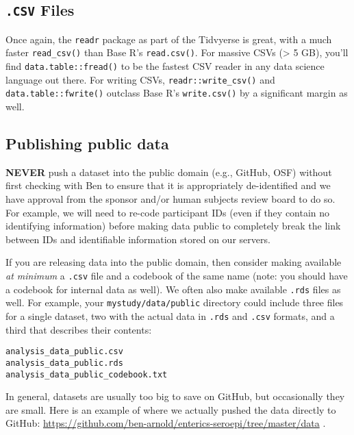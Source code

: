 \documentclass[
]{book}
\begin{document}
\hypertarget{csv-files}{%
\subsection{\texorpdfstring{\texttt{.CSV} Files}{.CSV Files}}\label{csv-files}}

Once again, the \texttt{readr} package as part of the Tidvyerse is great, with a much faster \texttt{read\_csv()} than Base R's \texttt{read.csv()}. For massive CSVs (\textgreater{} 5 GB), you'll find \texttt{data.table::fread()} to be the fastest CSV reader in any data science language out there. For writing CSVs, \texttt{readr::write\_csv()} and \texttt{data.table::fwrite()} outclass Base R's \texttt{write.csv()} by a significant margin as well.

\hypertarget{publishing-public-data}{%
\subsection{Publishing public data}\label{publishing-public-data}}

\textbf{NEVER} push a dataset into the public domain (e.g., GitHub, OSF) without first checking with Ben to ensure that it is appropriately de-identified and we have approval from the sponsor and/or human subjects review board to do so. For example, we will need to re-code participant IDs (even if they contain no identifying information) before making data public to completely break the link between IDs and identifiable information stored on our servers.

If you are releasing data into the public domain, then consider making available \emph{at minimum} a \texttt{.csv} file and a codebook of the same name (note: you should have a codebook for internal data as well). We often also make available \texttt{.rds} files as well. For example, your \texttt{mystudy/data/public} directory could include three files for a single dataset, two with the actual data in \texttt{.rds} and \texttt{.csv} formats, and a third that describes their contents:

\begin{verbatim}
analysis_data_public.csv
analysis_data_public.rds
analysis_data_public_codebook.txt
\end{verbatim}

In general, datasets are usually too big to save on GitHub, but occasionally they are small. Here is an example of where we actually pushed the data directly to GitHub: \url{https://github.com/ben-arnold/enterics-seroepi/tree/master/data} .
\end{document}
